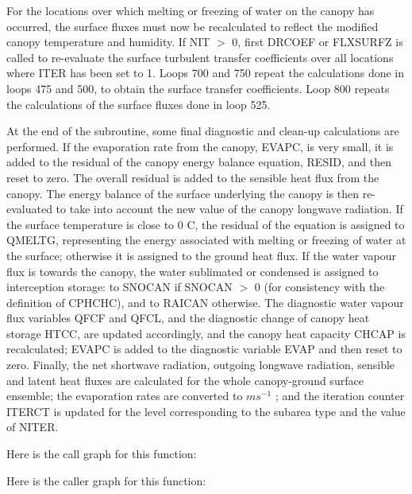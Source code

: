 For the locations over which melting or freezing of water on the canopy has occurred, the surface fluxes must now be recalculated to reflect the modified canopy temperature and humidity. If N\+I\+T $>$ 0, first D\+R\+C\+O\+E\+F or F\+L\+X\+S\+U\+R\+F\+Z is called to re-\/evaluate the surface turbulent transfer coefficients over all locations where I\+T\+E\+R has been set to 1. Loops 700 and 750 repeat the calculations done in loops 475 and 500, to obtain the surface transfer coefficients. Loop 800 repeats the calculations of the surface fluxes done in loop 525.

At the end of the subroutine, some final diagnostic and clean-\/up calculations are performed. If the evaporation rate from the canopy, E\+V\+A\+P\+C, is very small, it is added to the residual of the canopy energy balance equation, R\+E\+S\+I\+D, and then reset to zero. The overall residual is added to the sensible heat flux from the canopy. The energy balance of the surface underlying the canopy is then re-\/evaluated to take into account the new value of the canopy longwave radiation. If the surface temperature is close to 0 C, the residual of the equation is assigned to Q\+M\+E\+L\+T\+G, representing the energy associated with melting or freezing of water at the surface; otherwise it is assigned to the ground heat flux. If the water vapour flux is towards the canopy, the water sublimated or condensed is assigned to interception storage\+: to S\+N\+O\+C\+A\+N if S\+N\+O\+C\+A\+N $>$ 0 (for consistency with the definition of C\+P\+H\+C\+H\+C), and to R\+A\+I\+C\+A\+N otherwise. The diagnostic water vapour flux variables Q\+F\+C\+F and Q\+F\+C\+L, and the diagnostic change of canopy heat storage H\+T\+C\+C, are updated accordingly, and the canopy heat capacity C\+H\+C\+A\+P is recalculated; E\+V\+A\+P\+C is added to the diagnostic variable E\+V\+A\+P and then reset to zero. Finally, the net shortwave radiation, outgoing longwave radiation, sensible and latent heat fluxes are calculated for the whole canopy-\/ground surface ensemble; the evaporation rates are converted to $m s^{-1}$ ; and the iteration counter I\+T\+E\+R\+C\+T is updated for the level corresponding to the subarea type and the value of N\+I\+T\+E\+R.

Here is the call graph for this function\+:




Here is the caller graph for this function\+:


